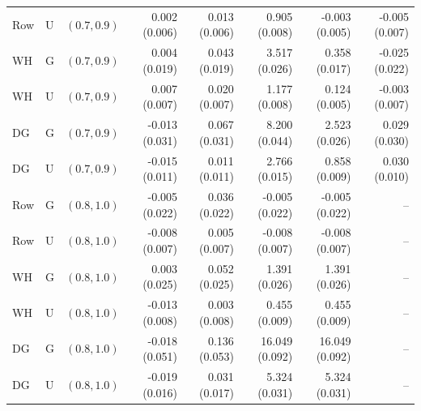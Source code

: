 \documentclass{article}
\theoremstyle{plain}
\theoremstyle{definition}
\theoremstyle{definition}
\begin{document}
\begin{table}[!htbp]
\begin{tabular}{@{}lllrrrrr@{}}
Row & U & $(0.7,0.9)$ & 0.002 (0.006) & 0.013 (0.006) & 0.905 (0.008) & -0.003 (0.005) & -0.005 (0.007) \\
WH & G & $(0.7,0.9)$ & 0.004 (0.019) & 0.043 (0.019) & 3.517 (0.026) & 0.358 (0.017) & -0.025 (0.022) \\
WH & U & $(0.7,0.9)$ & 0.007 (0.007) & 0.020 (0.007) & 1.177 (0.008) & 0.124 (0.005) & -0.003 (0.007) \\
DG & G & $(0.7,0.9)$ & -0.013 (0.031) & 0.067 (0.031) & 8.200 (0.044) & 2.523 (0.026) & 0.029 (0.030) \\
DG & U & $(0.7,0.9)$ & -0.015 (0.011) & 0.011 (0.011) & 2.766 (0.015) & 0.858 (0.009) & 0.030 (0.010) \\
\midrule
Row & G & $(0.8,1.0)$ & -0.005 (0.022) & 0.036 (0.022) & -0.005 (0.022) & -0.005 (0.022) & -- \\
Row & U & $(0.8,1.0)$ & -0.008 (0.007) & 0.005 (0.007) & -0.008 (0.007) & -0.008 (0.007) & -- \\
WH & G & $(0.8,1.0)$ & 0.003 (0.025) & 0.052 (0.025) & 1.391 (0.026) & 1.391 (0.026) & -- \\
WH & U & $(0.8,1.0)$ & -0.013 (0.008) & 0.003 (0.008) & 0.455 (0.009) & 0.455 (0.009) & -- \\
DG & G & $(0.8,1.0)$ & -0.018 (0.051) & 0.136 (0.053) & 16.049 (0.092) & 16.049 (0.092) & -- \\
DG & U & $(0.8,1.0)$ & -0.019 (0.016) & 0.031 (0.017) & 5.324 (0.031) & 5.324 (0.031) & -- \\
\bottomrule
\end{tabular}




\end{table}
\end{document}
